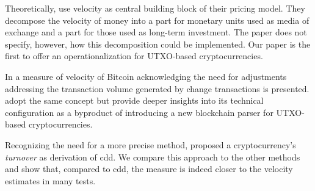 

Theoretically, \cite{bolt2016value} use velocity as central building block of
their pricing model. %
They decompose the velocity of money into a part for monetary units used as
media of exchange and a part for those used as long-term investment. %
The paper does not specify, however, how this decomposition could be
implemented. %
Our paper is the first to offer an operationalization for UTXO-based
cryptocurrencies.%

In \cite{athey2016bitcoin} a measure of velocity of Bitcoin
acknowledging the need for adjustments addressing the transaction volume
generated by change transactions is presented. %
\cite{kalodner2017blocksci} adopt the same concept but provide deeper
insights into its technical configuration as a byproduct of introducing a new
blockchain parser for UTXO-based cryptocurrencies. %
%


Recognizing the need for a more precise method, \cite{smith2017bitcoin} proposed
a cryptocurrency's \textit{turnover} as derivation of \ac{cdd}. %
We compare this approach to the other methods and show that, compared to
\ac{cdd}, the measure is indeed closer to the velocity estimates in many
tests. %




